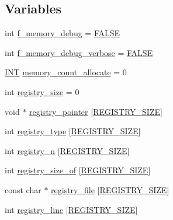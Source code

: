 \subsection*{Variables}
\begin{DoxyCompactItemize}
\item 
int \mbox{\hyperlink{_g_a_l_o_i_s_2memory_8_c_aa213e0d4b9b28f73e7ca292c19bad667}{f\+\_\+memory\+\_\+debug}} = \mbox{\hyperlink{nauty_8h_aa93f0eb578d23995850d61f7d61c55c1}{F\+A\+L\+SE}}
\item 
int \mbox{\hyperlink{_g_a_l_o_i_s_2memory_8_c_a4a84693fcfb1ac7dcd62bb1d017692a3}{f\+\_\+memory\+\_\+debug\+\_\+verbose}} = \mbox{\hyperlink{nauty_8h_aa93f0eb578d23995850d61f7d61c55c1}{F\+A\+L\+SE}}
\item 
\mbox{\hyperlink{galois_8h_a09fddde158a3a20bd2dcadb609de11dc}{I\+NT}} \mbox{\hyperlink{_g_a_l_o_i_s_2memory_8_c_aea4a3e289e6a4543125b577c8ccc361b}{memory\+\_\+count\+\_\+allocate}} = 0
\item 
int \mbox{\hyperlink{_g_a_l_o_i_s_2memory_8_c_a97ddfd7a5192ab526c9d304b6eb51603}{registry\+\_\+size}} = 0
\item 
void $\ast$ \mbox{\hyperlink{_g_a_l_o_i_s_2memory_8_c_a4594db91dd94030dd247c581666a0004}{registry\+\_\+pointer}} \mbox{[}\mbox{\hyperlink{_g_a_l_o_i_s_2memory_8_c_a56b4909adf7b15ea587d4f34bd639afa}{R\+E\+G\+I\+S\+T\+R\+Y\+\_\+\+S\+I\+ZE}}\mbox{]}
\item 
int \mbox{\hyperlink{_g_a_l_o_i_s_2memory_8_c_af3384b5c36854266f69b72f8545858df}{registry\+\_\+type}} \mbox{[}\mbox{\hyperlink{_g_a_l_o_i_s_2memory_8_c_a56b4909adf7b15ea587d4f34bd639afa}{R\+E\+G\+I\+S\+T\+R\+Y\+\_\+\+S\+I\+ZE}}\mbox{]}
\item 
int \mbox{\hyperlink{_g_a_l_o_i_s_2memory_8_c_a00f1a6daaabc0f0e54ef9740b6ce9008}{registry\+\_\+n}} \mbox{[}\mbox{\hyperlink{_g_a_l_o_i_s_2memory_8_c_a56b4909adf7b15ea587d4f34bd639afa}{R\+E\+G\+I\+S\+T\+R\+Y\+\_\+\+S\+I\+ZE}}\mbox{]}
\item 
int \mbox{\hyperlink{_g_a_l_o_i_s_2memory_8_c_a0fbcfe06e3f52b1a8426b3f4f556eabb}{registry\+\_\+size\+\_\+of}} \mbox{[}\mbox{\hyperlink{_g_a_l_o_i_s_2memory_8_c_a56b4909adf7b15ea587d4f34bd639afa}{R\+E\+G\+I\+S\+T\+R\+Y\+\_\+\+S\+I\+ZE}}\mbox{]}
\item 
const char $\ast$ \mbox{\hyperlink{_g_a_l_o_i_s_2memory_8_c_acafb13813225bb4f7562289434deaaad}{registry\+\_\+file}} \mbox{[}\mbox{\hyperlink{_g_a_l_o_i_s_2memory_8_c_a56b4909adf7b15ea587d4f34bd639afa}{R\+E\+G\+I\+S\+T\+R\+Y\+\_\+\+S\+I\+ZE}}\mbox{]}
\item 
int \mbox{\hyperlink{_g_a_l_o_i_s_2memory_8_c_aa59dfe39ad2cc532531b94c733e645cc}{registry\+\_\+line}} \mbox{[}\mbox{\hyperlink{_g_a_l_o_i_s_2memory_8_c_a56b4909adf7b15ea587d4f34bd639afa}{R\+E\+G\+I\+S\+T\+R\+Y\+\_\+\+S\+I\+ZE}}\mbox{]}
\end{DoxyCompactItemize}


